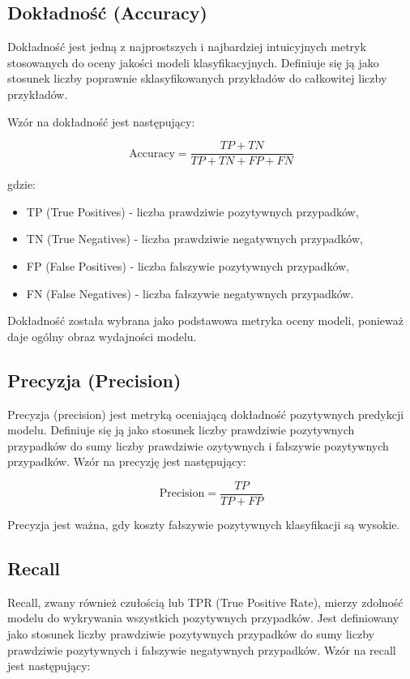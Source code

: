 \subsection*{Dokładność (Accuracy)}

Dokładność jest jedną z najprostszych i najbardziej intuicyjnych metryk stosowanych do oceny jakości modeli 
klasyfikacyjnych. Definiuje się ją jako stosunek liczby poprawnie sklasyfikowanych przykładów do całkowitej liczby 
przykładów.

Wzór na dokładność jest następujący:

\begin{equation}
\text{Accuracy} = \frac{TP + TN}{TP + TN + FP + FN}
\end{equation}

gdzie:
\begin{itemize}
    \item TP (True Positives) - liczba prawdziwie pozytywnych przypadków,
    \item TN (True Negatives) - liczba prawdziwie negatywnych przypadków,
    \item FP (False Positives) - liczba fałszywie pozytywnych przypadków,
    \item FN (False Negatives) - liczba fałszywie negatywnych przypadków.
\end{itemize}

Dokładność została wybrana jako podstawowa metryka oceny modeli, ponieważ daje ogólny obraz wydajności modelu.

\subsection*{Precyzja (Precision)}
Precyzja (precision) jest metryką oceniającą dokładność pozytywnych predykcji modelu. 
Definiuje się ją jako stosunek liczby prawdziwie pozytywnych przypadków do sumy liczby prawdziwie 
ozytywnych i fałszywie pozytywnych przypadków. Wzór na precyzję jest następujący:

\[
\text{Precision} = \frac{TP}{TP + FP}
\]

Precyzja jest ważna, gdy koszty fałszywie pozytywnych klasyfikacji są wysokie.

\subsection*{Recall}
Recall, zwany również czułością lub TPR (True Positive Rate), mierzy zdolność modelu do wykrywania 
wszystkich pozytywnych przypadków. Jest definiowany jako stosunek liczby prawdziwie pozytywnych 
przypadków do sumy liczby prawdziwie pozytywnych i fałszywie negatywnych przypadków. Wzór na recall 
jest następujący:

